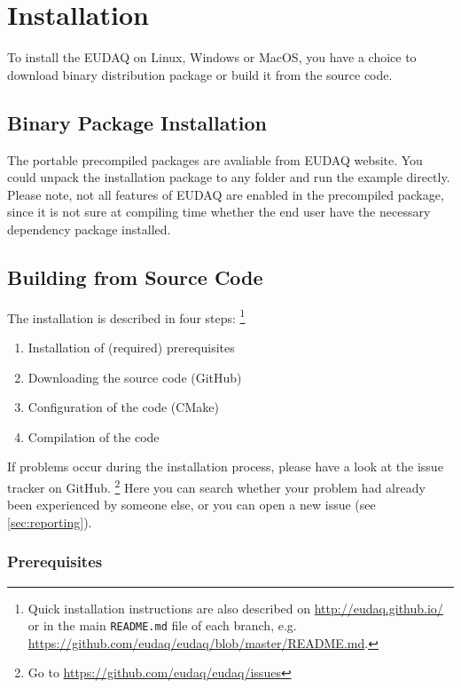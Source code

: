 \section{Installation}
To install the EUDAQ on Linux, Windows or MacOS, you have a choice to download binary distribution package or build it from the source code.

\subsection{Binary Package Installation}
The portable precompiled packages are avaliable from EUDAQ website. You could unpack the installation package to any folder and run the example directly. Please note, not all features of EUDAQ are enabled in the precompiled package, since it is not sure at compiling time whether the end user have the necessary dependency package installed.

\subsection{Building from Source Code}

The installation is described in four steps:%
\footnote{Quick installation instructions are also described on \url{http://eudaq.github.io/} or in the main \texttt{README.md} file of each branch, e.g. \url{https://github.com/eudaq/eudaq/blob/master/README.md}.}
\begin{enumerate}
\item Installation of (required) prerequisites
\item Downloading the source code (GitHub)
\item Configuration of the code (CMake)
\item Compilation of the code
\end{enumerate}

If problems occur during the installation process, please have a look at the issue tracker on GitHub.%
\footnote{Go to \url{https://github.com/eudaq/eudaq/issues}} 
Here you can search whether your problem had already been experienced by someone else, or you can open a new issue (see \autoref{sec:reporting}).

\subsubsection{Prerequisites}

